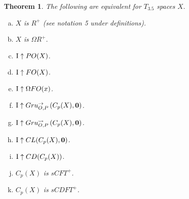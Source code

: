 \documentclass{amsart}
\theoremstyle{plain}
\newtheorem{theorem}{Theorem}
\theoremstyle{definition}
\theoremstyle{remark}
\theoremstyle{plain}
\theoremstyle{definition}
\theoremstyle{remark}
\begin{document}
\begin{theorem}
 The following are equivalent for \(T_{3.5}\) spaces \(X\).
 \begin{enumerate}[a)]
  \item \(X\) is \(R^+\) (see notation 5 under definitions).
  \item \(X\) is \(\Omega R^+\).
  \item \(\mathrm{I}\uparrow PO(X)\). 
  \item \(\mathrm{I}\uparrow FO(X)\).
  \item \(\mathrm{I}\uparrow\Omega FO(x)\).
  \item \(\mathrm{I}\uparrow Gru_{O,P}^{\to}\left({C_p(X)},{\mathbf 0}\right)\).
  \item \(\mathrm{I}\uparrow Gru_{O,P}^{\leadsto}\left({C_p(X)},{\mathbf 0}\right)\).
  \item \(\mathrm{I}\uparrow CL(C_p(X),\mathbf 0)\).
  \item \(\mathrm{I}\uparrow CD(C_p(X))\).
  \item \(C_p(X)\) is \(sCFT^+\).
  \item \(C_p(X)\) is \(sCDFT^+\).
 \end{enumerate}
\end{theorem}
\end{document}
